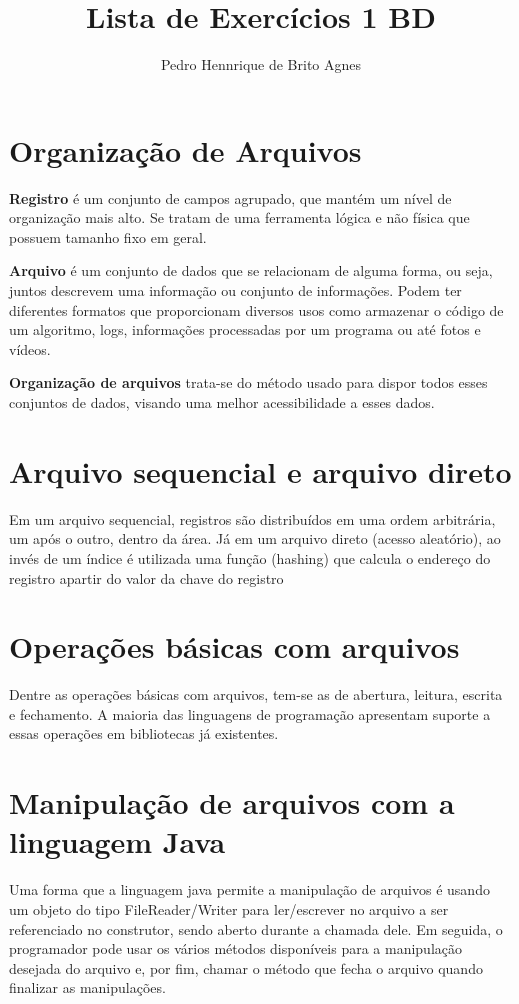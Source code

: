 \documentclass[12pt]{article}
\begin{document}
\title{Lista de Exercícios 1 BD}
\author{Pedro Hennrique de Brito Agnes}

\maketitle

\section{Organização de Arquivos}
\textbf{Registro} é um conjunto de campos agrupado, que mantém um nível de organização mais alto. Se tratam de uma ferramenta lógica e não física que possuem tamanho fixo em geral. 

\noindent
\textbf{Arquivo} é um conjunto de dados que se relacionam de alguma forma, ou seja, juntos descrevem uma informação ou conjunto de informações. Podem ter diferentes formatos que proporcionam diversos usos como armazenar o código de um algoritmo, logs, informações processadas por um programa ou até fotos e vídeos.

\noindent
\textbf{Organização de arquivos} trata-se do método usado para dispor todos esses conjuntos de dados, visando uma melhor acessibilidade a esses dados.

\section{Arquivo sequencial e arquivo direto}
Em um arquivo sequencial, registros são distribuídos em uma ordem arbitrária, um após o outro, dentro da área.
Já em um arquivo direto (acesso aleatório), ao invés de um índice é utilizada uma função (hashing) que calcula o endereço do registro apartir do valor da chave do registro

\section{Operações básicas com arquivos}
Dentre as operações básicas com arquivos, tem-se as de abertura, leitura, escrita e fechamento. A maioria das linguagens de programação apresentam suporte a essas operações em bibliotecas já existentes.

\section{Manipulação de arquivos com a linguagem Java}
Uma forma que a linguagem java permite a manipulação de arquivos é usando um objeto do tipo FileReader/Writer para ler/escrever no arquivo a ser referenciado no construtor, sendo aberto durante a chamada dele.
Em seguida, o programador pode usar os vários métodos disponíveis para a manipulação desejada do arquivo e, por fim, chamar o método que fecha o arquivo quando finalizar as manipulações.
\end{document}
